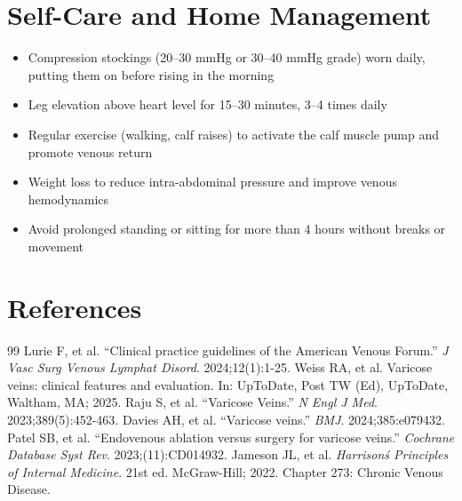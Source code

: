 \section*{Self-Care and Home Management}
\begin{itemize}
  \item Compression stockings (20--30 mmHg or 30--40 mmHg grade) worn daily, putting them on before rising in the morning
  \item Leg elevation above heart level for 15--30 minutes, 3--4 times daily
  \item Regular exercise (walking, calf raises) to activate the calf muscle pump and promote venous return
  \item Weight loss to reduce intra-abdominal pressure and improve venous hemodynamics
  \item Avoid prolonged standing or sitting for more than 4 hours without breaks or movement
\end{itemize}

\section*{References}
\begin{thebibliography}{99}
 Lurie F, et al. ``Clinical practice guidelines of the American Venous Forum.'' \emph{J Vasc Surg Venous Lymphat Disord}. 2024;12(1):1-25.
 Weiss RA, et al. Varicose veins: clinical features and evaluation. In: UpToDate, Post TW (Ed), UpToDate, Waltham, MA; 2025.
 Raju S, et al. ``Varicose Veins.'' \emph{N Engl J Med}. 2023;389(5):452-463.
 Davies AH, et al. ``Varicose veins.'' \emph{BMJ}. 2024;385:e079432.
 Patel SB, et al. ``Endovenous ablation versus surgery for varicose veins.'' \emph{Cochrane Database Syst Rev}. 2023;(11):CD014932.
 Jameson JL, et al. \emph{Harrison\'s Principles of Internal Medicine}. 21st ed. McGraw-Hill; 2022. Chapter 273: Chronic Venous Disease.
\end{thebibliography}
